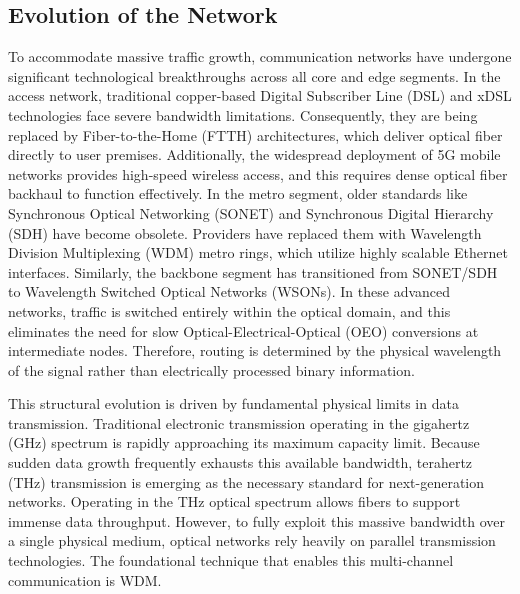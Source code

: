 \documentclass[12pt, a4paper, twoside, openright]{report}
\begin{document}
\subsection{Evolution of the Network}
To accommodate massive traffic growth, communication networks have undergone significant technological breakthroughs across all core and edge segments. In the access network, traditional copper-based Digital Subscriber Line (DSL) and xDSL technologies face severe bandwidth limitations. Consequently, they are being replaced by Fiber-to-the-Home (FTTH) architectures, which deliver optical fiber directly to user premises. Additionally, the widespread deployment of 5G mobile networks provides high-speed wireless access, and this requires dense optical fiber backhaul to function effectively. In the metro segment, older standards like Synchronous Optical Networking (SONET) and Synchronous Digital Hierarchy (SDH) have become obsolete. Providers have replaced them with Wavelength Division Multiplexing (WDM) metro rings, which utilize highly scalable Ethernet interfaces. Similarly, the backbone segment has transitioned from SONET/SDH to Wavelength Switched Optical Networks (WSONs). In these advanced networks, traffic is switched entirely within the optical domain, and this eliminates the need for slow Optical-Electrical-Optical (OEO) conversions at intermediate nodes. Therefore, routing is determined by the physical wavelength of the signal rather than electrically processed binary information.

This structural evolution is driven by fundamental physical limits in data transmission. Traditional electronic transmission operating in the gigahertz (GHz) spectrum is rapidly approaching its maximum capacity limit. Because sudden data growth frequently exhausts this available bandwidth, terahertz (THz) transmission is emerging as the necessary standard for next-generation networks. Operating in the THz optical spectrum allows fibers to support immense data throughput. However, to fully exploit this massive bandwidth over a single physical medium, optical networks rely heavily on parallel transmission technologies. The foundational technique that enables this multi-channel communication is WDM.
\end{document}

